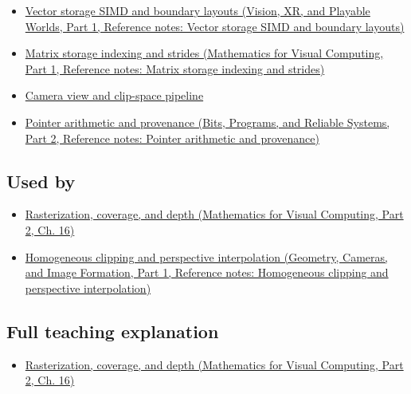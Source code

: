 \begin{itemize}
\tightlist
\item
  \href{../07-Vision-XR-and-Playable-Worlds-P01/main.pdf\#appendix-26bf6bf2fb8b}{Vector storage SIMD and boundary layouts (Vision, XR, and Playable Worlds, Part 1, Reference notes: Vector storage SIMD and boundary layouts)}
\item
  \href{../02-Mathematics-for-Visual-Computing-P01/main.pdf\#appendix-ffdc1d4e5350}{Matrix storage indexing and strides (Mathematics for Visual Computing, Part 1, Reference notes: Matrix storage indexing and strides)}
\item
  \hyperref[appendix-1c07d64f5e70]{Camera view and clip-space pipeline}
\item
  \href{../01-Bits-Programs-and-Reliable-Systems-P02/main.pdf\#appendix-6af5921bc853}{Pointer arithmetic and provenance (Bits, Programs, and Reliable Systems, Part 2, Reference notes: Pointer arithmetic and provenance)}
\end{itemize}

\subsection{Used by}\label{appendix-749ba51a6c25-used-by}

\hypertarget{appendix-749ba51a6c25-used-by}{}

\begin{itemize}
\tightlist
\item
  \href{../02-Mathematics-for-Visual-Computing-P02/main.pdf\#03-visual-computing-i-ch012-rasterization-coverage-and-depth}{Rasterization, coverage, and depth (Mathematics for Visual Computing, Part 2, Ch. 16)}
\item
  \href{../03-Geometry-Cameras-and-Image-Formation-P01/main.pdf\#appendix-40426e4b2103}{Homogeneous clipping and perspective interpolation (Geometry, Cameras, and Image Formation, Part 1, Reference notes: Homogeneous clipping and perspective interpolation)}
\end{itemize}

\subsection{Full teaching explanation}\label{appendix-749ba51a6c25-full-teaching-explanation}

\hypertarget{appendix-749ba51a6c25-full-teaching-explanation}{}

\begin{itemize}
\tightlist
\item
  \href{../02-Mathematics-for-Visual-Computing-P02/main.pdf\#03-visual-computing-i-ch012-rasterization-coverage-and-depth}{Rasterization, coverage, and depth (Mathematics for Visual Computing, Part 2, Ch. 16)}
\end{itemize}

